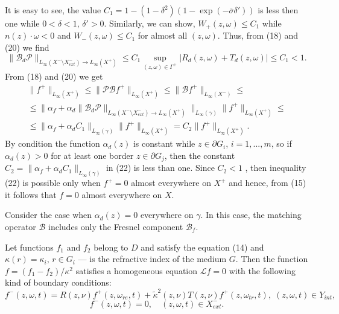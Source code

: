 \documentclass[12pt,reqno]{report}
\begin{document}
It is easy to see, the value $C_1=1-(1-\delta^2)(1-\exp \left (- \overline{\sigma} \delta'\right))$ is less then one while $0<\delta<1,\,\delta'>0$.
Similarly, we can show, $W_+(z,\omega) \leq C_1$ while $n(z) \cdot \omega<0$ and $W_-(z,\omega) \leq C_1$ for almost all $(z,\omega)$. 
Thus, from (18) and (20) we find
\begin{equation}
\|\mathcal B_d \mathcal  P  \|_{L_{\infty}(X^-\setminus X^-_{ext})\to L_{\infty}(X^+)}  \leq    
C_1 \sup \limits_{(z,\omega) \in \Gamma^+}\left| R_d (z,\omega)+ T_d (z,\omega) \right| \leq C_1<1.
\end{equation}
From (18) and (20) we get
\begin{multline}
\|f^+\|_{L_{\infty}(X^+)} \leq \|\mathcal P \mathcal B f^+\|_{L_{\infty}(X^+)} 
\leq 
\| \mathcal B f^+\|_{L_{\infty}(X^-)} 
\leq \\ \leq 
\|\alpha_f +\alpha_d \|\mathcal  B_d \mathcal P \|_{L_{\infty}(X^-\setminus X^-_{ext})\to L_{\infty}(X^+)} \|_{L_{\infty}(\gamma)}  \|  f^+\|_{L_{\infty}(X^+)} \leq \\ \leq 
 \|\alpha_f  +\alpha_d C_1 \|_{L_{\infty}(\gamma)}  \| f^+\|_{L_{\infty}(X^+)}= C_2\| f^+\|_{L_{\infty}(X^+)}.
\end{multline}
By condition the function $\alpha_d(z)$  is constant while $z\in \partial G_i$, $i=1,...,m$, so if $\alpha_d(z)>0$ 
for at least one border $z\in \partial G_j$, then the constant $C_2= \|\alpha_f  +\alpha_d C_1 \|_{L_{\infty}(\gamma)}$ in (22) is less than one. 
Since $C_2<1$ , then inequality (22) is possible only when $f^+=0$ almost everywhere on $X^+$ and hence, 
from (15) it follows that $f = 0$ almost everywhere on $X$.

Consider the case when $ \alpha_d (z) = 0 $ everywhere on $\gamma$. In this case, the matching operator $\mathcal B$ includes only the Fresnel component $\mathcal B_f $.

Let functions $f_1$ and $f_2$ belong to $D$ and satisfy the equation (14) and $ \kappa(r) = \kappa_i, \, r \in G_i $ ---
is the refractive index of the medium $G$. Then the function $f=(f_1-f_2)/\kappa^2$ satisfies a homogeneous equation
${\mathcal L} f = 0$ with the following kind of boundary conditions:
\begin{equation}
f^-(z,\omega,t)=R (z,\nu) f^+(z,\omega_{re},t) +
\widetilde{\kappa}^2(z,\nu) T(z,\nu) f^+(z,\omega_{tr},t), \;
(z,\omega,t) \in Y_{int},
\end{equation}
\begin{equation}
f^-(z,\omega,t)=0, \quad (z,\omega,t) \in X^-_{ext}.
\end{equation}
\end{document}
